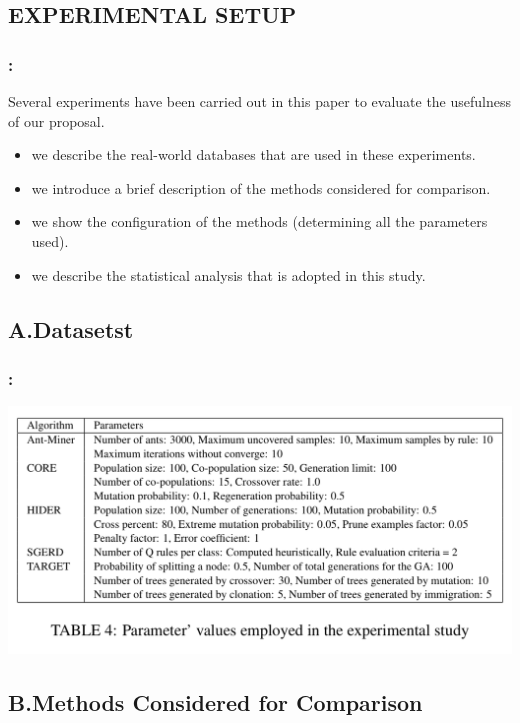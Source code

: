 \documentclass{beamer}
\begin{document}
\begin{CJK*}{UTF8}{bsmi}
\section{EXPERIMENTAL SETUP}

\begin{frame}
	\frametitle{\insertsection : \insertsubsection}
	Several experiments have been carried out in this paper to evaluate the usefulness of our proposal.
	\begin{itemize}
		\item we describe the real-world databases that are used in these experiments.
		\item we introduce a brief description of the methods considered for comparison.
		\item we show the configuration of the methods (determining all the parameters used).
		\item we describe the statistical analysis that is adopted in this study.
	\end{itemize}
\end{frame}

\subsection{A.Datasetst}

\begin{frame}
	\frametitle{\insertsection : \insertsubsection}
	
	\begin{center}
		\includegraphics[height=.7\textheight]{./9.png}
	\end{center}
\end{frame}

\subsection{B.Methods Considered for Comparison}


\end{CJK*}
\end{document}
